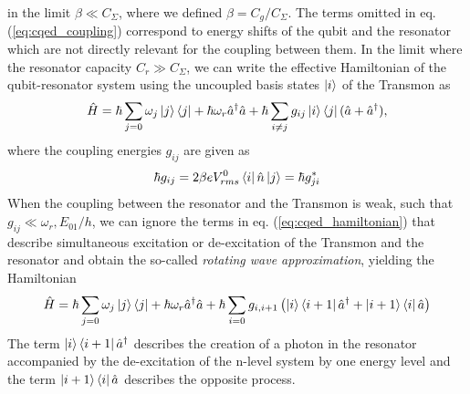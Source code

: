 %
in the limit $\beta \ll C_\Sigma$, where we defined $\beta = C_g/C_\Sigma$. The terms omitted in eq. (\ref{eq:cqed_coupling}) correspond to energy shifts of the qubit and the resonator which are not directly relevant for the coupling between them. 
 In the limit where the resonator capacity $C_r \gg C_\Sigma$, we can write the effective Hamiltonian of the qubit-resonator system using the uncoupled basis states $\left| i \right>$ of the Transmon as
%
\begin{equation}
\hat{H} = \hbar \sum\limits_{j=0} \omega_j \left| j \right>\left< j \right| + \hbar \omega_r \hat{a}^\dagger \hat{a} + \hbar \sum\limits_{i\ne j} g_{ij} \left| i \right>\left< j \right|(\hat{a}+\hat{a}^\dagger), \label{eq:cqed_hamiltonian}
\end{equation}
%
where the coupling energies $g_{ij}$ are given as
%
\begin{equation}
\hbar g_{ij} = 2\beta e V_{rms}^0 \left< i \right|\hat{n}\left| j \right> = \hbar g_{ji}^*
\end{equation}
%
When the coupling between the resonator and the Transmon is weak, such that $g_{ij} \ll \omega_r,E_{01}/h$, we can ignore the terms in eq. (\ref{eq:cqed_hamiltonian}) that describe simultaneous excitation or de-excitation of the Transmon and the resonator and obtain the so-called {\it rotating wave approximation}, yielding the Hamiltonian
%
\begin{equation}
\hat{H} = \hbar \sum\limits_{j=0} \omega_j \left| j \right>\left< j \right|+\hbar \omega_r \hat{a}^\dagger \hat{a} + \hbar \sum\limits_{i=0} g_{i,i+1}\left(\left| i \right>\left< i+1 \right|\hat{a}^\dagger +\left| i+1 \right>\left< i \right|\hat{a}\right) \label{eq:cqed_rotating_wave}
\end{equation}
%
The term $\left| i \right>\left< i+1 \right|\hat{a}^\dagger$ describes the creation of a photon in the resonator accompanied by the de-excitation of the n-level system by one energy level and the term $\left| i+1 \right>\left< i \right|\hat{a}$ describes the opposite process.

\smallskip

